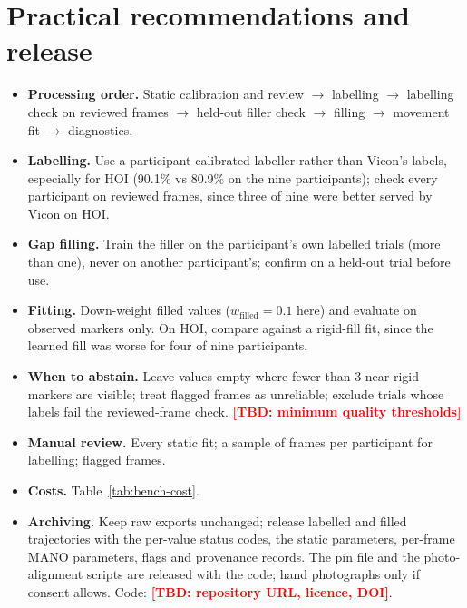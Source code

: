 \documentclass[11pt,a4paper]{article}
\newcommand{\tbd}[1]{\textcolor{red}{\textbf{[TBD: #1]}}}
\begin{document}
\section{Practical recommendations and release}\label{sec:recommend}
\begin{itemize}[nosep]
  \item \textbf{Processing order.} Static calibration and review $\rightarrow$ labelling $\rightarrow$ labelling check on
  reviewed frames $\rightarrow$ held-out filler check $\rightarrow$ filling $\rightarrow$ movement fit $\rightarrow$
  diagnostics.
  \item \textbf{Labelling.} Use a participant-calibrated labeller rather than Vicon's labels, especially for HOI
  (90.1\% vs 80.9\% on the nine participants); check every participant on reviewed frames, since three of nine were
  better served by Vicon on HOI.
  \item \textbf{Gap filling.} Train the filler on the participant's own labelled trials (more than one), never on
  another participant's; confirm on a held-out trial before use.
  \item \textbf{Fitting.} Down-weight filled values ($w_\text{filled}=0.1$ here) and evaluate on observed markers only.
  On HOI, compare against a rigid-fill fit, since the learned fill was worse for four of nine participants.
  \item \textbf{When to abstain.} Leave values empty where fewer than 3 near-rigid markers are visible; treat flagged
  frames as unreliable; exclude trials whose labels fail the reviewed-frame check. \tbd{minimum quality thresholds}
  \item \textbf{Manual review.} Every static fit; a sample of frames per participant for labelling; flagged frames.
  \item \textbf{Costs.} Table~\ref{tab:bench-cost}.
  \item \textbf{Archiving.} Keep raw exports unchanged; release labelled and filled trajectories with the per-value
  status codes, the static parameters, per-frame MANO parameters, flags and provenance records. The pin file and the
  photo-alignment scripts are released with the code; hand photographs only if consent allows.
  Code: \tbd{repository URL, licence, DOI}.
\end{itemize}
\end{document}
